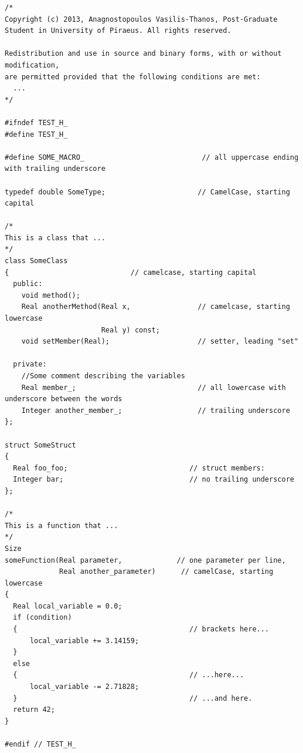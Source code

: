 \documentclass{assignment}
\begin{document}
\begin{lstlisting}[style=cpp]
/*
Copyright (c) 2013, Anagnostopoulos Vasilis-Thanos, Post-Graduate Student in University of Piraeus. All rights reserved.

Redistribution and use in source and binary forms, with or without modification,
are permitted provided that the following conditions are met:
  ...
*/

#ifndef TEST_H_
#define TEST_H_

#define SOME_MACRO_                            // all uppercase ending with trailing underscore

typedef double SomeType;                      // CamelCase, starting capital

/*
This is a class that ...
*/
class SomeClass 
{                             // camelcase, starting capital
  public:
    void method();
    Real anotherMethod(Real x,                // camelcase, starting lowercase
                       Real y) const;
    void setMember(Real);                     // setter, leading "set"

  private:
    //Some comment describing the variables
    Real member_;                             // all lowercase with underscore between the words
    Integer another_member_;                  // trailing underscore
};

struct SomeStruct 
{
  Real foo_foo;                             // struct members:
  Integer bar;                              // no trailing underscore
};

/*
This is a function that ...
*/
Size 
someFunction(Real parameter,             // one parameter per line,
             Real another_parameter)      // camelCase, starting lowercase
{    
  Real local_variable = 0.0;
  if (condition)
  {                                         // brackets here...
      local_variable += 3.14159;
  } 
  else  
  {                                         // ...here...
      local_variable -= 2.71828;
  }                                         // ...and here.
  return 42;
}

#endif // TEST_H_
\end{lstlisting}





\end{document}
